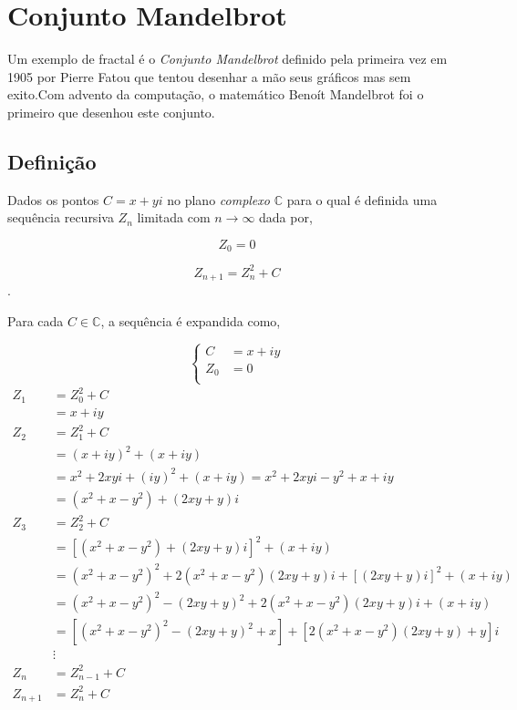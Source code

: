 \documentclass[12pt,a4paper]{article}
\begin{document}
	
	
\newpage
\section{Conjunto Mandelbrot}
	Um exemplo de fractal é o \textit{Conjunto Mandelbrot} definido pela primeira vez em 1905 por Pierre Fatou que tentou desenhar a mão seus gráficos mas sem exito.Com advento da computação, o matemático Benoít Mandelbrot foi o primeiro que desenhou este conjunto.
	
\subsection{Definição}
	Dados os pontos $C = x+yi$ no plano \textit{complexo} $\mathbb{C}$ para o qual é definida uma sequência recursiva $Z_n$ limitada com $n \to \infty$ dada por,
	
	$$Z_0 = 0$$
	
	$$ Z_{n+1} = Z_{n}^{2} + C$$.
	
	Para cada $C \in \mathbb{C}$, a sequência é expandida como,

	\[
		\begin{cases}
			C &= x + iy \\
			Z_0 &= 0 \\
		\end{cases}
	\]
	\begin{align*}
		Z_1 &= Z_0^2 + C \\
		\qquad {} &= x + iy \\
		Z_2 &= Z_1^2 + C \\
			&= (x + iy)^2 + (x + iy) \\
			&= x^2 + 2xyi + (iy)^2 + (x + iy) = x^2 + 2xyi - y^2 + x + iy \\
			&= (x^2 + x - y^2) + (2xy + y)i \\
		Z_3 &= Z_2^2 + C \\
			&= [ (x^2 + x - y^2) + (2xy + y)i ]^2 + (x + iy) \\
			&= (x^2 + x - y^2)^2 + 2(x^2 + x - y^2 )(2xy +y)i + [ ( 2xy + y)i ]^2 + ( x + iy ) \\
			&= (x^2+ x - y^2)^2 - (2xy + y)^2 + 2(x^2 + x - y^2)(2xy + y)i + (x + iy) \\
			&= [ (x^2 + x - y^2)^2 - (2xy + y)^2 + x ] + [2(x^2 + x - y^2)(2xy + y) + y]i \\
		&\vdots \\
		Z_n &= Z_{n - 1}^2 + C \\
		Z_{n+1} &= Z_n^2 + C
	\end{align*}
	\\
	
\end{document}

